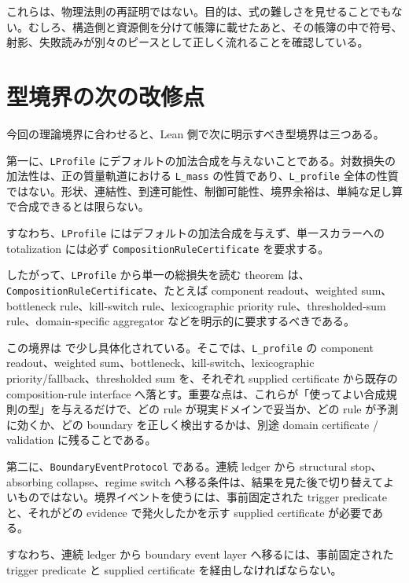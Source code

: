 \documentclass[12pt,a4paper]{article}
\begin{document}
これらは、物理法則の再証明ではない。目的は、式の難しさを見せることでもない。むしろ、構造側と資源側を分けて帳簿に載せたあと、その帳簿の中で符号、射影、失敗読みが別々のピースとして正しく流れることを確認している。

\section{型境界の次の改修点}\label{ux578bux5883ux754cux306eux6b21ux306eux6539ux4feeux70b9}

今回の理論境界に合わせると、Lean 側で次に明示すべき型境界は三つある。

第一に、\texttt{LProfile} にデフォルトの加法合成を与えないことである。対数損失の加法性は、正の質量軌道における \texttt{L\_mass} の性質であり、\texttt{L\_profile} 全体の性質ではない。形状、連結性、到達可能性、制御可能性、境界余裕は、単純な足し算で合成できるとは限らない。

すなわち、\texttt{LProfile} にはデフォルトの加法合成を与えず、単一スカラーへの totalization には必ず \texttt{CompositionRuleCertificate} を要求する。

したがって、\texttt{LProfile} から単一の総損失を読む theorem は、\texttt{CompositionRuleCertificate}、たとえば component readout、weighted sum、bottleneck rule、kill-switch rule、lexicographic priority rule、thresholded-sum rule、domain-specific aggregator などを明示的に要求するべきである。

この境界は {\scriptsize{}} で少し具体化されている。そこでは、\texttt{L\_profile} の component readout、weighted sum、bottleneck、kill-switch、lexicographic priority/fallback、thresholded sum を、それぞれ supplied certificate から既存の composition-rule interface へ落とす。重要な点は、これらが「使ってよい合成規則の型」を与えるだけで、どの rule が現実ドメインで妥当か、どの rule が予測に効くか、どの boundary を正しく検出するかは、別途 domain certificate / validation に残ることである。

第二に、\texttt{BoundaryEventProtocol} である。連続 ledger から structural stop、absorbing collapse、regime switch へ移る条件は、結果を見た後で切り替えてよいものではない。境界イベントを使うには、事前固定された trigger predicate と、それがどの evidence で発火したかを示す supplied certificate が必要である。

すなわち、連続 ledger から boundary event layer へ移るには、事前固定された trigger predicate と supplied certificate を経由しなければならない。
\end{document}
